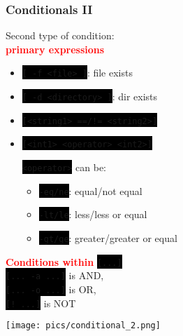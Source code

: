 \documentclass[unknownkeysallowed, 10pt, a4 paper, handout]{beamer}
\newcommand{\focus}[1]{\textbf{\textcolor{red}{#1}}}
\newcommand{\code}[1]{\colorbox{black}{\color{green}\texttt{#1}}}
\newcommand{\sidebyside}[5]{
  \begin{minipage}{#1\textwidth}
    #2
  \end{minipage} #3 \begin{minipage}{#4\textwidth}
    #5
  \end{minipage}
}
\begin{document}
\begin{frame}
  \begin{center}
    \frametitle{Conditionals II}

    \sidebyside{0.58}{
      \centering
      Second type of condition:\\
      \focus{primary expressions}

      \vspace{2mm}

      \begin{itemize}
        \item \code{[ -f <file> ]}: file exists\\
        \item \code{[ -d <directory> ]}: dir exists\\
        \item \code{[<string1> ==/!= <string2>]}
        \item \code{[<int1> <operator> <int2>]}

        \vspace{1mm}

        \code{<operator>} can be:
        \begin{itemize}
          \item \code{-eq/ne}: equal/not equal
          \item \code{-lt/le}: less/less or equal
          \item \code{-gt/ge}: greater/greater or equal
        \end{itemize}
      \end{itemize}

      \focus{Conditions within} \code{[...]}\\
      \code{[... -a ...]} is AND,\\
      \code{[... -o ...]} is OR,\\
      \code{[! ...]} is NOT
    }{\hfill}{0.40}{
      \begin{center}
        \texttt{[image: pics/conditional\_2.png]}
      \end{center}
    }
  \end{center}
\end{frame}
\end{document}
